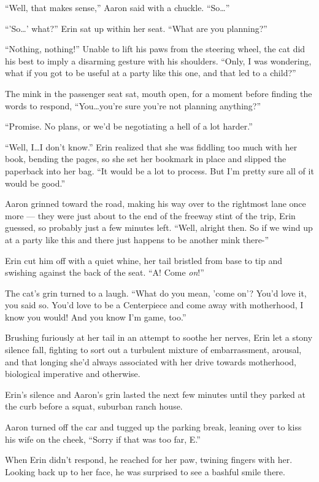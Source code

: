 ``Well, that makes sense,'' Aaron said with a chuckle. ``So\ldots{}''

``'So\ldots{}' what?'' Erin sat up within her seat. ``What are you planning?''

``Nothing, nothing!'' Unable to lift his paws from the steering wheel, the cat did his best to imply a disarming gesture with his shoulders. ``Only, I was wondering, what if you got to be useful at a party like this one, and that led to a child?''

The mink in the passenger seat sat, mouth open, for a moment before finding the words to respond, ``You\ldots{}you're sure you're not planning anything?''

``Promise. No plans, or we'd be negotiating a hell of a lot harder.''

``Well, I\ldots{}I don't know.'' Erin realized that she was fiddling too much with her book, bending the pages, so she set her bookmark in place and slipped the paperback into her bag. ``It would be a lot to process. But I'm pretty sure all of it would be good.''

Aaron grinned toward the road, making his way over to the rightmost lane once more --- they were just about to the end of the freeway stint of the trip, Erin guessed, so probably just a few minutes left. ``Well, alright then. So if we wind up at a party like this and there just happens to be another mink there-''

Erin cut him off with a quiet whine, her tail bristled from base to tip and swishing against the back of the seat. ``A! Come \textit{on}!''

The cat's grin turned to a laugh. ``What do you mean, 'come on'? You'd love it, you said so. You'd love to be a Centerpiece and come away with motherhood, I know you would! And you know I'm game, too.''

Brushing furiously at her tail in an attempt to soothe her nerves, Erin let a stony silence fall, fighting to sort out a turbulent mixture of embarrassment, arousal, and that longing she'd always associated with her drive towards motherhood, biological imperative and otherwise.

Erin's silence and Aaron's grin lasted the next few minutes until they parked at the curb before a squat, suburban ranch house.

Aaron turned off the car and tugged up the parking break, leaning over to kiss his wife on the cheek, ``Sorry if that was too far, E.''

When Erin didn't respond, he reached for her paw, twining fingers with her. Looking back up to her face, he was surprised to see a bashful smile there.

